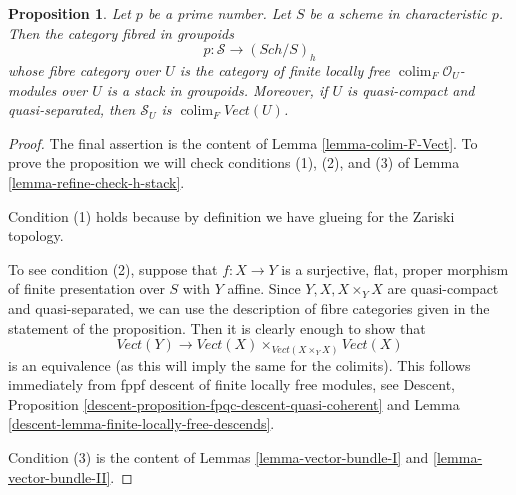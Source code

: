 \documentclass[10pt,a4paper]{amsart}
\theoremstyle{plain}
\newtheorem{proposition}[subsection]{Proposition}
\theoremstyle{definition}
\theoremstyle{remark}
\numberwithin{equation}{subsection}
\def\colim{\mathop{\mathrm{colim}}\nolimits}
\def\Sch{\mathit{Sch}}
\begin{document}
\begin{proposition}
\label{proposition-h-descent-vector-bundles-p}
Let $p$ be a prime number. Let $S$ be a scheme in characteristic $p$.
Then the category fibred in groupoids
$$
p : \mathcal{S} \longrightarrow (\Sch/S)_h
$$
whose fibre category over $U$ is the category
of finite locally free $\colim_F \mathcal{O}_U$-modules over $U$
is a stack in groupoids. Moreover, if $U$ is quasi-compact
and quasi-separated, then $\mathcal{S}_U$ is $\colim_F \textit{Vect}(U)$.
\end{proposition}

\begin{proof}
The final assertion is the content of Lemma \ref{lemma-colim-F-Vect}.
To prove the proposition we will check conditions (1), (2), and (3) of
Lemma \ref{lemma-refine-check-h-stack}.

\medskip\noindent
Condition (1) holds because by definition we have glueing
for the Zariski topology.

\medskip\noindent
To see condition (2), suppose that $f : X \to Y$ is a surjective,
flat, proper morphism of finite presentation over $S$ with $Y$ affine.
Since $Y, X, X \times_Y X$ are quasi-compact and quasi-separated,
we can use the description of fibre categories given in the
statement of the proposition. Then it is clearly enough to
show that
$$
\textit{Vect}(Y)
\longrightarrow
\textit{Vect}(X)
\times_{\textit{Vect}(X \times_Y X)}
\textit{Vect}(X)
$$
is an equivalence (as this will imply the same for the colimits).
This follows immediately from fppf descent of finite locally free modules, see
Descent, Proposition \ref{descent-proposition-fpqc-descent-quasi-coherent} and
Lemma \ref{descent-lemma-finite-locally-free-descends}.

\medskip\noindent
Condition (3) is the content of
Lemmas \ref{lemma-vector-bundle-I} and \ref{lemma-vector-bundle-II}.
\end{proof}
\end{document}
